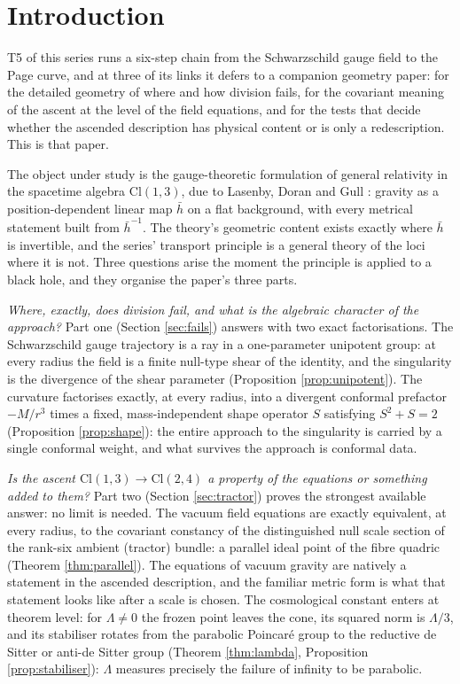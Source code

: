 \documentclass[11pt]{article}
\theoremstyle{definition}
\newcommand{\Cl}{\mathrm{Cl}}
\newcommand{\hb}{\bar{h}}
\begin{document}
\newpage
\section{Introduction}\label{sec:intro}

T5 of this series \cite{ButlerT5} runs a six-step chain from the Schwarzschild gauge field to the Page curve, and at three of its links it defers to a companion geometry paper: for the detailed geometry of where and how division fails, for the covariant meaning of the ascent at the level of the field equations, and for the tests that decide whether the ascended description has physical content or is only a redescription. This is that paper.

The object under study is the gauge-theoretic formulation of general relativity in the spacetime algebra $\Cl(1,3)$, due to Lasenby, Doran and Gull \cite{LDG1998}: gravity as a position-dependent linear map $\hb$ on a flat background, with every metrical statement built from $\hb^{-1}$. The theory's geometric content exists exactly where $\hb$ is invertible, and the series' transport principle \cite{ButlerT1} is a general theory of the loci where it is not. Three questions arise the moment the principle is applied to a black hole, and they organise the paper's three parts.

\emph{Where, exactly, does division fail, and what is the algebraic character of the approach?} Part one (Section \ref{sec:fails}) answers with two exact factorisations. The Schwarzschild gauge trajectory is a ray in a one-parameter unipotent group: at every radius the field is a finite null-type shear of the identity, and the singularity is the divergence of the shear parameter (Proposition \ref{prop:unipotent}). The curvature factorises exactly, at every radius, into a divergent conformal prefactor $-M/r^3$ times a fixed, mass-independent shape operator $S$ satisfying $S^2 + S = 2$ (Proposition \ref{prop:shape}): the entire approach to the singularity is carried by a single conformal weight, and what survives the approach is conformal data.

\emph{Is the ascent $\Cl(1,3) \to \Cl(2,4)$ a property of the equations or something added to them?} Part two (Section \ref{sec:tractor}) proves the strongest available answer: no limit is needed. The vacuum field equations are exactly equivalent, at every radius, to the covariant constancy of the distinguished null scale section of the rank-six ambient (tractor) bundle: a parallel ideal point of the fibre quadric (Theorem \ref{thm:parallel}). The equations of vacuum gravity are natively a statement in the ascended description, and the familiar metric form is what that statement looks like after a scale is chosen. The cosmological constant enters at theorem level: for $\Lambda \neq 0$ the frozen point leaves the cone, its squared norm is $\Lambda/3$, and its stabiliser rotates from the parabolic Poincar\'e group to the reductive de Sitter or anti-de Sitter group (Theorem \ref{thm:lambda}, Proposition \ref{prop:stabiliser}): $\Lambda$ measures precisely the failure of infinity to be parabolic.
\end{document}
